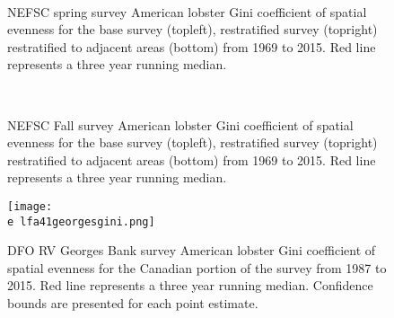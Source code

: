 \documentclass[11pt]{article}
\newcommand{\e}{/backup/bio_data/bio.lobster/figures/}
\begin{document}
\begin{figure}
\centering
{}
\\
\caption{NEFSC spring survey American lobster Gini coefficient of spatial evenness for the base survey (topleft), restratified survey (topright) restratified to adjacent areas (bottom) from 1969 to 2015. Red line represents a three year running median.  }
\end{figure}
\clearpage



\begin{figure}
\centering
{}
\\
\caption{NEFSC Fall survey American lobster Gini coefficient of spatial evenness for the base survey (topleft), restratified survey (topright) restratified to adjacent areas (bottom) from 1969 to 2015. Red line represents a three year running median.  }
\end{figure}
\clearpage


\begin{figure}

    \texttt{[image: \\e lfa41georgesgini.png]}
    \caption{DFO RV Georges Bank survey American lobster Gini coefficient of spatial evenness for the Canadian portion of the survey from 1987 to 2015. Red line represents a three year running median. Confidence bounds are presented for each point estimate.}

\end{figure}
\end{document}
